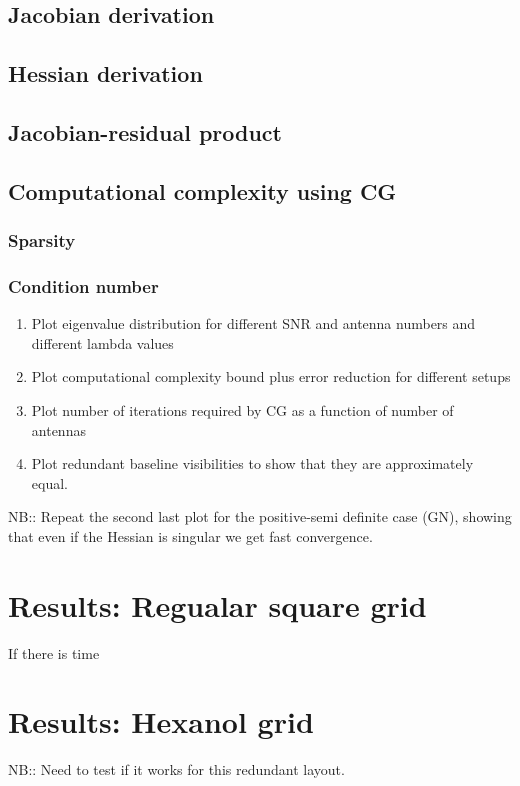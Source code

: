 \documentclass[a4paper,fleqn,usenatbib]{mnras}
\begin{document}
\subsection{Jacobian derivation}
\subsection{Hessian derivation}
\subsection{Jacobian-residual product}

\subsection{Computational complexity using CG}
\subsubsection{Sparsity}
\subsubsection{Condition number}

\begin{enumerate}
 \item Plot eigenvalue distribution for different SNR and antenna numbers and different lambda values
 \item Plot computational complexity bound plus error reduction for different setups
 \item Plot number of iterations required by CG as a function of number of antennas
 \item Plot redundant baseline visibilities to show that they are approximately equal.
\end{enumerate}

NB:: Repeat the second last plot for the positive-semi definite case (GN), showing that even if the Hessian is singular we get fast convergence.

\section{Results: Regualar square grid}
If there is time

\section{Results: Hexanol grid}
NB:: Need to test if it works for this redundant layout.
\end{document}
